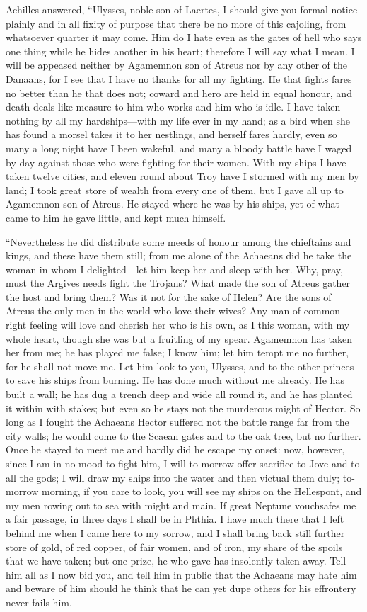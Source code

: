 Achilles answered, “Ulysses, noble son of Laertes, I should give you
formal notice plainly and in all fixity of purpose that there be no more
of this cajoling, from whatsoever quarter it may come. Him do I hate even
as the gates of hell who says one thing while he hides another in his
heart; therefore I will say what I mean. I will be appeased neither by
Agamemnon son of Atreus nor by any other of the Danaans, for I see that I
have no thanks for all my fighting. He that fights fares no better than he
that does not; coward and hero are held in equal honour, and death deals
like measure to him who works and him who is idle. I have taken nothing by
all my hardships—with my life ever in my hand; as a bird when she
has found a morsel takes it to her nestlings, and herself fares hardly,
even so many a long night have I been wakeful, and many a bloody battle
have I waged by day against those who were fighting for their women. With
my ships I have taken twelve cities, and eleven round about Troy have I
stormed with my men by land; I took great store of wealth from every one
of them, but I gave all up to Agamemnon son of Atreus. He stayed where he
was by his ships, yet of what came to him he gave little, and kept much
himself.

“Nevertheless he did distribute some meeds of honour among the chieftains
and kings, and these have them still; from me alone of the Achaeans did he
take the woman in whom I delighted—let him keep her and sleep with
her. Why, pray, must the Argives needs fight the Trojans? What made the
son of Atreus gather the host and bring them? Was it not for the sake of
Helen? Are the sons of Atreus the only men in the world who love their
wives? Any man of common right feeling will love and cherish her who is
his own, as I this woman, with my whole heart, though she was but a
fruitling of my spear. Agamemnon has taken her from me; he has played me
false; I know him; let him tempt me no further, for he shall not move me.
Let him look to you, Ulysses, and to the other princes to save his ships
from burning. He has done much without me already. He has built a wall; he
has dug a trench deep and wide all round it, and he has planted it within
with stakes; but even so he stays not the murderous might of Hector. So
long as I fought the Achaeans Hector suffered not the battle range far
from the city walls; he would come to the Scaean gates and to the oak
tree, but no further. Once he stayed to meet me and hardly did he escape
my onset: now, however, since I am in no mood to fight him, I will
to-morrow offer sacrifice to Jove and to all the gods; I will draw my
ships into the water and then victual them duly; to-morrow morning, if you
care to look, you will see my ships on the Hellespont, and my men rowing
out to sea with might and main. If great Neptune vouchsafes me a fair
passage, in three days I shall be in Phthia. I have much there that I left
behind me when I came here to my sorrow, and I shall bring back still
further store of gold, of red copper, of fair women, and of iron, my share
of the spoils that we have taken; but one prize, he who gave has
insolently taken away. Tell him all as I now bid you, and tell him in
public that the Achaeans may hate him and beware of him should he think
that he can yet dupe others for his effrontery never fails him.

